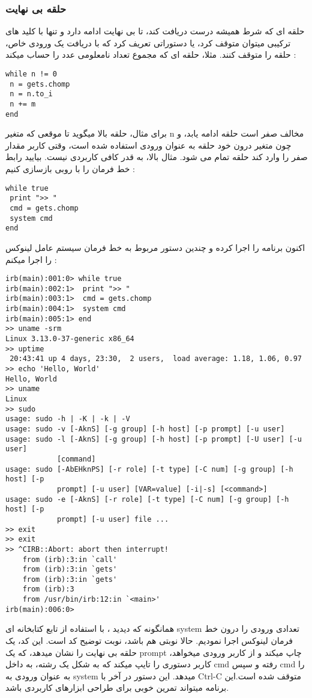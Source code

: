 \documentclass[11pt]{article}
\begin{document}
\subsubsection{حلقه بی نهایت}
حلقه ای که شرط همیشه درست دریافت کند، تا بی نهایت ادامه دارد و تنها با کلید های ترکیبی 
میتوان متوقف کرد، یا دستوراتی تعریف کرد که با دریافت یک ورودی خاص، حلقه را متوقف کنند. مثلا، حلقه ای که مجموع تعداد نامعلومی عدد را حساب میکند :
\begin{latin}
\begin{verbatim}
while n != 0
 n = gets.chomp
 n = n.to_i
 n += m
end
\end{verbatim}
\end{latin}
برای مثال، حلقه بالا میگوید تا موقعی که متغیر n مخالف صفر است حلقه ادامه یابد، و چون متغیر درون خود حلقه به عنوان ورودی استفاده شده است، وقتی کاربر مقدار صفر را وارد کند حلقه تمام می شود. مثال بالا، به قدر کافی کاربردی نیست. بیایید رابط خط فرمان
را با روبی بازسازی کنیم :
\begin{latin}
\begin{verbatim}
while true
 print ">> "
 cmd = gets.chomp
 system cmd
end
\end{verbatim}
\end{latin}
اکنون برنامه را اجرا کرده و چندین دستور مربوط به خط فرمان سیستم عامل لینوکس را اجرا میکنم :
\begin{latin}
\begin{verbatim}
irb(main):001:0> while true
irb(main):002:1>  print ">> "
irb(main):003:1>  cmd = gets.chomp
irb(main):004:1>  system cmd
irb(main):005:1> end
>> uname -srm
Linux 3.13.0-37-generic x86_64
>> uptime
 20:43:41 up 4 days, 23:30,  2 users,  load average: 1.18, 1.06, 0.97
>> echo 'Hello, World'
Hello, World
>> uname 
Linux
>> sudo
usage: sudo -h | -K | -k | -V
usage: sudo -v [-AknS] [-g group] [-h host] [-p prompt] [-u user]
usage: sudo -l [-AknS] [-g group] [-h host] [-p prompt] [-U user] [-u user]
            [command]
usage: sudo [-AbEHknPS] [-r role] [-t type] [-C num] [-g group] [-h host] [-p
            prompt] [-u user] [VAR=value] [-i|-s] [<command>]
usage: sudo -e [-AknS] [-r role] [-t type] [-C num] [-g group] [-h host] [-p
            prompt] [-u user] file ...
>> exit
>> exit
>> ^CIRB::Abort: abort then interrupt!
	from (irb):3:in `call'
	from (irb):3:in `gets'
	from (irb):3:in `gets'
	from (irb):3
	from /usr/bin/irb:12:in `<main>'
irb(main):006:0>
\end{verbatim}
\end{latin}
همانگونه که دیدید ، با استفاده از تابع کتابخانه ای system تعدادی ورودی را درون خط فرمان لینوکس اجرا نمودیم. حالا نوبتی هم باشد، نوبت توضیح کد است. این کد، یک حلقه بی نهایت را نشان میدهد، که یک prompt چاپ میکند و از کاربر ورودی میخواهد، کاربر دستوری را تایپ میکند که به شکل یک رشته، به داخل cmd رفته و سپس cmd را به عنوان ورودی به system میدهد. این دستور در آخر با Ctrl-C متوقف شده است.این برنامه میتواند تمرین خوبی برای طراحی ابزارهای کاربردی باشد. 
\end{document}

